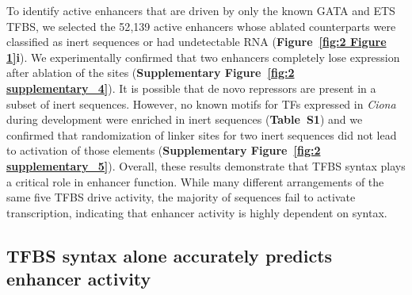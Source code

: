 To identify active enhancers that are driven by only the known GATA and ETS TFBS, we selected the 52{,}139 active enhancers whose ablated counterparts were classified as inert sequences or had undetectable RNA (\textbf{Figure~\ref{fig:2 Figure 1}i}). We experimentally confirmed that two enhancers completely lose expression after ablation of the sites (\textbf{Supplementary Figure~\ref{fig:2 supplementary_4}}). It is possible that de novo repressors are present in a subset of inert sequences. However, no known motifs for TFs expressed in \textit{Ciona} during development were enriched in inert sequences (\textbf{Table~S1}) and we confirmed that randomization of linker sites for two inert sequences did not lead to activation of those elements (\textbf{Supplementary Figure~\ref{fig:2 supplementary_5}}). Overall, these results demonstrate that TFBS syntax plays a critical role in enhancer function. While many different arrangements of the same five TFBS drive activity, the majority of sequences fail to activate transcription, indicating that enhancer activity is highly dependent on syntax.

\subsection{TFBS syntax alone accurately predicts enhancer activity}

